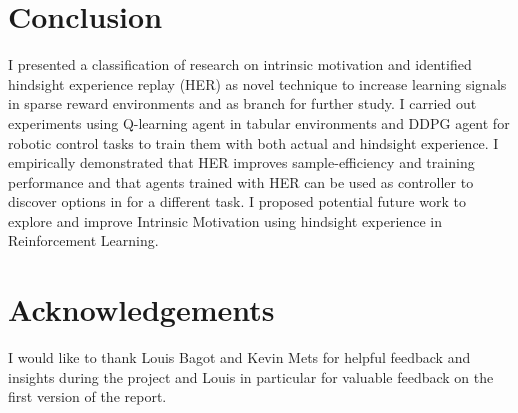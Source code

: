\documentclass[conference]{IEEEtran}
\begin{document}
\section{Conclusion} \label{sec:conclusion}
I presented a classification of research on intrinsic motivation and identified hindsight experience replay (HER) as novel technique to increase learning signals in sparse reward environments and as branch for further study. I carried out experiments using Q-learning agent in tabular environments and DDPG agent for robotic control tasks to train them with both actual and hindsight experience. I empirically demonstrated that HER improves sample-efficiency and training performance and that agents trained with HER can be used as controller to discover options in for a different task. I proposed potential future work to explore and improve Intrinsic Motivation using hindsight experience in Reinforcement Learning.

\section*{Acknowledgements}
I would like to thank Louis Bagot and Kevin Mets for helpful feedback and insights during the project and Louis in particular for valuable feedback on the first version of the report.

\printbibliography
\end{document}
